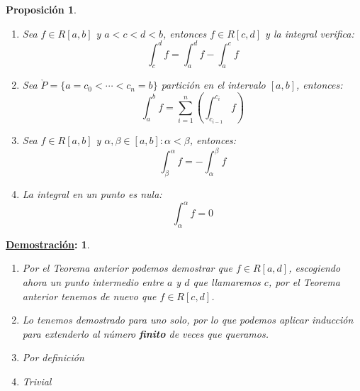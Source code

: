 \documentclass[10pt,a4paper,openright]{book}
\theoremstyle{break}
\newtheorem*{prop}{Proposición}
\newtheorem*{demo}{\underline{Demostración}:}
\begin{document}
\begin{prop}
\begin{enumerate}
\item Sea $f\in R[a,b]$ y $a<c<d<b$, entonces $f\in R[c,d]$ y la integral verifica:
$$\int_{c}^{d} f = \int_{a}^{d} f - \int_{a}^{c} f$$

\item Sea $\mathring{P} = \{a = c_0 < \cdots < c_n = b\}$ partición en el intervalo $[a,b]$, entonces:
$$\int_{a}^{b} f = \sum_{i = 1}^{n} \left(\int_{c_{i-1}}^{c_i} f\right)$$

\item Sea $f\in R[a,b]$ y $\alpha,\beta\in [a,b]: \alpha < \beta$, entonces:
$$\int_{\beta}^{\alpha} f {=} - \int_{\alpha}^{\beta} f$$
\item La integral en un punto es nula:
$$\int_{\alpha}^{\alpha} f = 0$$
\end{enumerate}
\end{prop}
\begin{demo}
\begin{enumerate}
\item Por el Teorema anterior podemos demostrar que $f\in R[a,d]$, escogiendo ahora un punto intermedio entre $a$ y $d$ que llamaremos $c$, por el Teorema anterior tenemos de nuevo que $f\in R[c,d]$.

\item Lo tenemos demostrado para uno solo, por lo que podemos aplicar inducción para extenderlo al número \textbf{finito} de veces que queramos.

\item Por definición

\item Trivial
\end{enumerate}
\end{demo}
\end{document}
